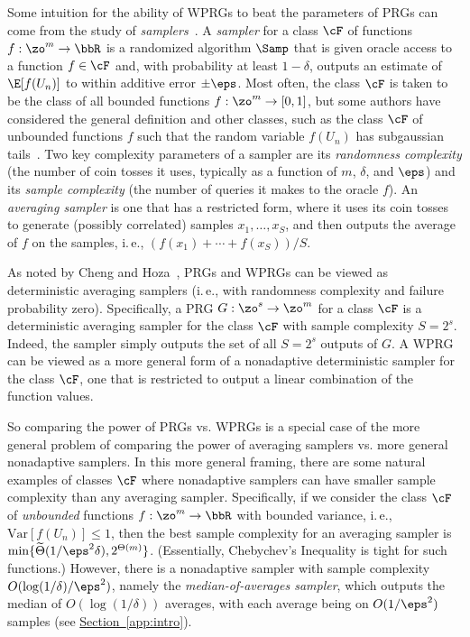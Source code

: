 \documentclass[11pt]{article}
\newcommand{\expref}[2]{\texorpdfstring{\hyperref[#2]{#1~\ref{#2}}}{#1~\ref{#2}}}
\newcommand{\ie}{i.\,e.}
\begin{document}
Some intuition for the ability of WPRGs to beat the parameters of PRGs can come from
the study of \emph{samplers}~\cite{Goldreich97}.  A \emph{sampler} for a class $\cF$ of
functions $f : \zo^m\rightarrow \bbR$ is %
a 
%
randomized algorithm $\Samp$ that is given 
oracle access to a function $f\in \cF$ and, with probability at least $1-\delta$, outputs an estimate of $\E[f(U_n)]$ to within additive error $\pm \eps$. Most often, the class $\cF$ is taken to be the class of all bounded functions $f : \zo^m \rightarrow [0,1]$, but some
%
authors  %
have considered the general definition and other classes, such as the class $\cF$ of unbounded functions $f$ such that the random variable $f(U_n)$ has subgaussian tails~\cite{Blasiok18,Agrawal19}.  Two key complexity parameters of a sampler are its \emph{randomness complexity} (the number of coin tosses it uses, typically as a function of $m$, $\delta$, and $\eps$)  and its 
\emph{sample complexity} (the number of queries it makes to the oracle $f$).
An \emph{averaging sampler} is one that has a restricted form, where it uses its coin tosses to generate (possibly correlated) samples $x_1,\ldots,x_S$, and then outputs the average of $f$
on the samples, \ie, $(f(x_1)+\cdots+f(x_S))/S$.

As noted by Cheng and Hoza~\cite{ChengHo20}, PRGs and WPRGs can be viewed as deterministic averaging samplers (\ie, with randomness complexity and failure probability zero).  Specifically,
a PRG $G : \zo^s\rightarrow \zo^m$ for a class $\cF$ is a deterministic averaging sampler for the class $\cF$ with sample complexity $S=2^s$.  Indeed, the sampler simply outputs the set of all $S=2^s$ outputs of $G$. A WPRG can be viewed as a more general form of a nonadaptive deterministic sampler for the class $\cF$, one that is restricted to output a linear combination of the function values.

So comparing the power of PRGs vs. WPRGs is a special case of the more general problem of comparing the power of averaging samplers vs. more general nonadaptive samplers.  In this more general framing, there are some natural examples of classes $\cF$ where nonadaptive samplers can have smaller sample complexity than any averaging sampler.  Specifically, if we consider the class $\cF$ of \emph{unbounded} functions $f : \zo^m\rightarrow \bbR$ with bounded variance, \ie, $\mathrm{Var}[f(U_n)]\leq 1$, then the best sample complexity for an averaging sampler is
$\min\{\widetilde{\Theta}(1/\eps^2\delta),2^{\Theta(m)}\}$. (Essentially, Chebychev's Inequality is tight for such functions.)  However, there is a nonadaptive sampler with sample complexity $O(\log(1/\delta)/\eps^2)$, namely the \emph{median-of-averages sampler}, which outputs the median of $O(\log(1/\delta))$ averages, with each average being on $O(1/\eps^2)$ samples (see \expref{Section}{app:intro}).
\end{document}

